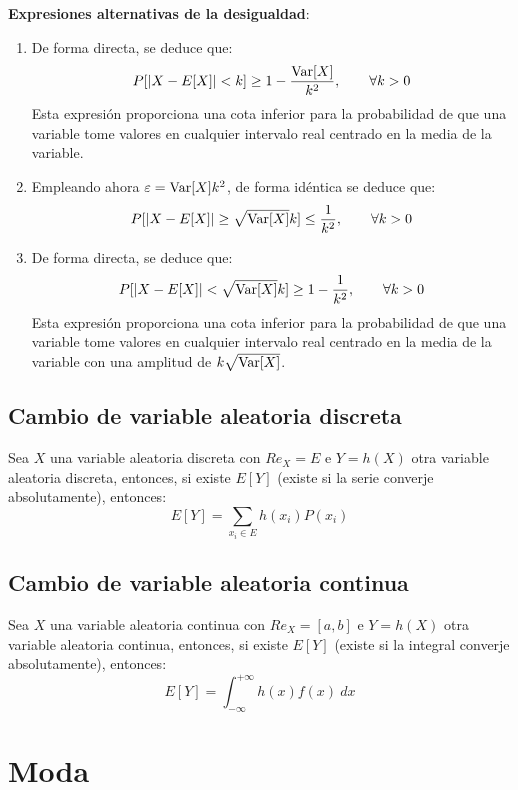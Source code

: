 \textbf{Expresiones alternativas de la desigualdad}:
\begin{enumerate}
    \item De forma directa, se deduce que:
    \begin{equation*}
        P[|X-E[X]| < k]\geq 1-\frac{\operatorname{Var}[X]}{k^2},\qquad \forall k>0
    \end{equation*}
    Esta expresión proporciona una cota inferior para la probabilidad de que una variable tome valores en cualquier intervalo real centrado en la media de la variable.

    \item Empleando ahora $\varepsilon=\operatorname{Var}[X]k^2$, de forma idéntica se deduce que:
    \begin{equation*}
        P[|X-E[X]|\geq \sqrt{\operatorname{Var}[X]}k]\leq \frac{1}{k^2},\qquad \forall k>0
    \end{equation*}

    \item De forma directa, se deduce que:
    \begin{equation*}
        P[|X-E[X]|< \sqrt{\operatorname{Var}[X]}k]\geq 1-\frac{1}{k^2},\qquad \forall k>0
    \end{equation*}
    Esta expresión proporciona una cota inferior para la probabilidad de que una variable tome valores en cualquier intervalo real centrado en la media de la variable con una amplitud de $k\sqrt{\operatorname{Var}[X]}$.
\end{enumerate}

\subsection{Cambio de variable aleatoria discreta}

Sea $X$ una variable aleatoria discreta con $Re_X=E$ e $Y=h(X)$ otra variable aleatoria discreta, entonces,
si existe $E[Y]$ (existe si la serie converje absolutamente), entonces:
$$E[Y] = \sum_{x_i \in E}h(x_i)P(x_i)$$

\subsection{Cambio de variable aleatoria continua}

Sea $X$ una variable aleatoria continua con $Re_X=[a,b]$ e $Y=h(X)$ otra variable aleatoria continua, entonces,
si existe $E[Y]$ (existe si la integral converje absolutamente), entonces:
$$E[Y] = \int_{-\infty}^{+\infty} h(x)f(x)~dx$$

\section{Moda}
